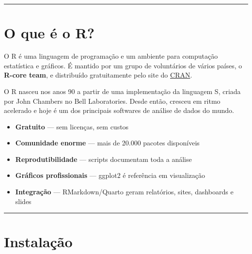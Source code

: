 \documentclass[
  letterpaper,
]{scrbook}
\providecommand{\tightlist}{%
  \setlength{\itemsep}{0pt}\setlength{\parskip}{0pt}}
\begin{document}
\begin{center}\rule{0.5\linewidth}{0.5pt}\end{center}

\section{O que é o R?}\label{o-que-uxe9-o-r-1}

O R é uma linguagem de programação e um ambiente para computação
estatística e gráficos. É mantido por um grupo de voluntários de vários
países, o \textbf{R-core team}, e distribuído gratuitamente pelo site do
\href{https://cran.r-project.org/}{CRAN}.

O R nasceu nos anos 90 a partir de uma implementação da linguagem S,
criada por John Chambers no Bell Laboratories. Desde então, cresceu em
ritmo acelerado e hoje é um dos principais softwares de análise de dados
do mundo.

\begin{tcolorbox}[enhanced jigsaw, arc=.35mm, bottomrule=.15mm, bottomtitle=1mm, breakable, colback=white, colbacktitle=quarto-callout-tip-color!10!white, colframe=quarto-callout-tip-color-frame, coltitle=black, left=2mm, leftrule=.75mm, opacityback=0, opacitybacktitle=0.6, rightrule=.15mm, title=\textcolor{quarto-callout-tip-color}{\faLightbulb}\hspace{0.5em}{Por que aprender R?}, titlerule=0mm, toprule=.15mm, toptitle=1mm]

\begin{itemize}
\tightlist
\item
  \textbf{Gratuito} --- sem licenças, sem custos
\item
  \textbf{Comunidade enorme} --- mais de 20.000 pacotes disponíveis
\item
  \textbf{Reprodutibilidade} --- scripts documentam toda a análise
\item
  \textbf{Gráficos profissionais} --- ggplot2 é referência em
  visualização
\item
  \textbf{Integração} --- RMarkdown/Quarto geram relatórios, sites,
  dashboards e slides
\end{itemize}

\end{tcolorbox}

\begin{center}\rule{0.5\linewidth}{0.5pt}\end{center}

\section{Instalação}\label{instalauxe7uxe3o-1}
\end{document}
